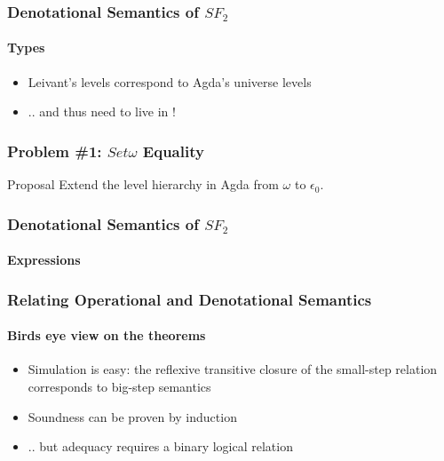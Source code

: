 \documentclass[dvipsnames,aspectratio=169,pdftex]{beamer}
\begin{document}
\begin{frame}
  \frametitle{Denotational Semantics of $SF_2$}
  \framesubtitle{Types}
  \TFTEnv
  \TFTSem
  \begin{itemize}
    \item Leivant’s levels correspond to Agda’s universe levels
    \item .. and thus  need to live in !
  \end{itemize}
\end{frame}

\begin{frame}
  \frametitle{Problem \#1: $Set \omega$ Equality}
  \begin{exampleblock}{Proposal}
    Extend the level hierarchy in Agda from $\omega$ to $\epsilon_0$.
  \end{exampleblock}
\end{frame}

\begin{frame}
  \frametitle{Denotational Semantics of $SF_2$}
  \framesubtitle{Expressions}
  \TFVEnv
  \TFExprSem
\end{frame}

\begin{frame}[fragile]
  \frametitle{Relating Operational and Denotational Semantics}
  \framesubtitle{Birds eye view on the theorems}
    \vspace{5mm}
    \begin{itemize}
      \item Simulation is easy: the reflexive transitive closure of the small-step relation corresponds to big-step semantics
      \item Soundness can be proven by induction
      \item .. but adequacy requires a binary logical relation 
    \end{itemize}
\end{frame}
\end{document}
